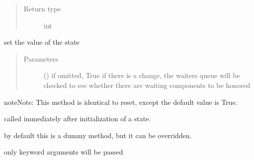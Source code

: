 \documentclass[letterpaper,10pt,english]{sphinxmanual}
\begin{document}
\begin{fulllineitems}
\begin{fulllineitems}
\begin{quote}
\begin{description}
\item[{Return type}] \leavevmode
int

\end{description}\end{quote}

\end{fulllineitems}


\begin{fulllineitems}
\label{\detokenize{Reference:salabim.State.set}}
set the value of the state
\begin{quote}\begin{description}
\item[{Parameters}] \leavevmode
{} (\sphinxstyleliteralemphasis{\sphinxupquote{ (}}\sphinxstyleliteralemphasis{\sphinxupquote{)}}) \textendash{} if omitted, True 
if there is a change, the waiters queue will be checked
to see whether there are waiting components to be honored

\end{description}\end{quote}

\begin{sphinxadmonition}{note}{Note:}
This method is identical to reset, except the default value is True.
\end{sphinxadmonition}

\end{fulllineitems}


\begin{fulllineitems}
\label{\detokenize{Reference:salabim.State.setup}}
called immediately after initialization of a state.

by default this is a dummy method, but it can be overridden.

only keyword arguments will be passed

\end{fulllineitems}



\end{fulllineitems}
\end{document}
